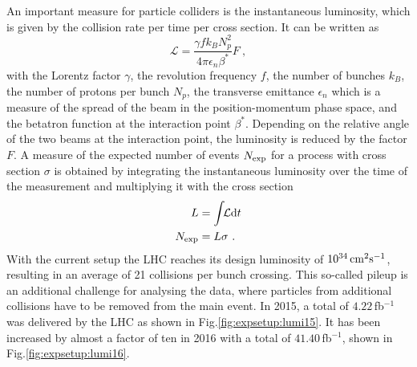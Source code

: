 \noindent An important measure for particle colliders is the instantaneous luminosity, which is given by the collision rate per time per cross section. It can be written as
\begin{equation}
\mathcal{L} = \frac{\gamma f k_B N_p^2}{4\pi \epsilon_n \beta^*}F ~ ,
\end{equation}
with the Lorentz factor $\gamma$, the revolution frequency $f$, the number of bunches $k_B$, the number of protons per bunch $N_p$, the transverse emittance $\epsilon_n$ which is a measure of the spread of the beam in the position-momentum phase space, and the betatron function at the interaction point $\beta^*$. Depending on the relative angle of the two beams at the interaction point, the luminosity is reduced by the factor $F$. A measure of the expected number of events $N_{\rm exp}$ for a process with cross section $\sigma$ is obtained by integrating the instantaneous luminosity over the time of the measurement and multiplying it with the cross section
\begin{align}
L &= \int \!\! \mathcal{L} {\rm d}t \\
N_{\rm exp} &= L \sigma ~.
\end{align}
With the current setup the LHC reaches its design luminosity of $10^{34}\,\rm{cm}^2\rm{s}^{-1}$, resulting in an average of 21 collisions per bunch crossing. This so-called pileup is an additional challenge for analysing the data, where particles from additional collisions have to be removed from the main event. In 2015, a total of $4.22$\,fb$^{-1}$ was delivered by the LHC as shown in Fig.\ref{fig:expsetup:lumi15}. It has been increased by almost a factor of ten in 2016 with a total of $41.40$\,fb$^{-1}$, shown in Fig.\ref{fig:expsetup:lumi16}.\\


